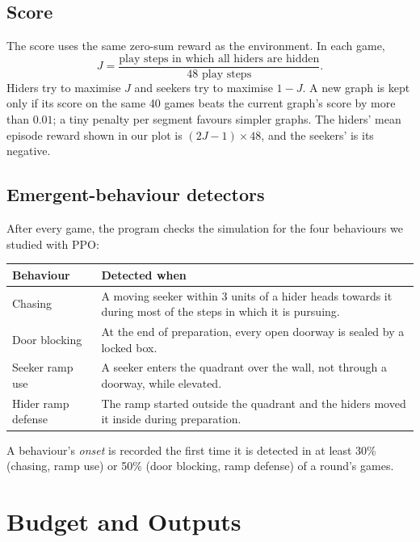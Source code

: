 \documentclass[11pt]{article}
\begin{document}
\subsection{Score}

The score uses the same zero-sum reward as the environment. In each game,
\[
  J = \frac{\text{play steps in which all hiders are hidden}}{\text{48 play steps}}.
\]
Hiders try to maximise $J$ and seekers try to maximise $1-J$. A new graph is kept
only if its score on the same 40 games beats the current graph's score by more
than $0.01$; a tiny penalty per segment favours simpler graphs. The hiders' mean
episode reward shown in our plot is $(2J-1)\times 48$, and the seekers' is its
negative.

\subsection{Emergent-behaviour detectors}
\label{sec:detectors}

After every game, the program checks the simulation for the four behaviours we
studied with PPO:

\begin{tabularx}{\linewidth}{@{}l Y@{}}
  \toprule
  Behaviour & Detected when \\
  \midrule
  Chasing            & A moving seeker within 3 units of a hider heads towards it during most of
                       the steps in which it is pursuing. \\
  Door blocking      & At the end of preparation, every open doorway is sealed by a locked box. \\
  Seeker ramp use    & A seeker enters the quadrant over the wall, not through a doorway, while
                       elevated. \\
  Hider ramp defense & The ramp started outside the quadrant and the hiders moved it inside during
                       preparation. \\
  \bottomrule
\end{tabularx}

\medskip
A behaviour's \emph{onset} is recorded the first time it is detected in at least
30\% (chasing, ramp use) or 50\% (door blocking, ramp defense) of a round's games.

\section{Budget and Outputs}
\end{document}
